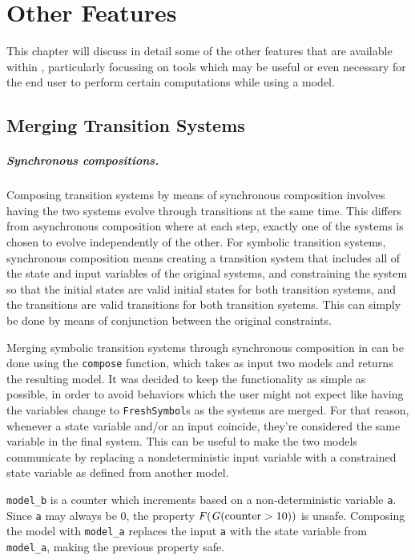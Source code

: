 \chapter{Other Features}
\label{ch:other-features}

This chapter will discuss in detail some of the other features that are available within \pyvmt{}, particularly focussing on tools which may be useful or even necessary for the end user to perform certain computations while using a model.

\section{Merging Transition Systems}
\paragraph*{Synchronous compositions.}
Composing transition systems by means of synchronous composition involves having the two systems evolve through transitions at the same time.
This differs from asynchronous composition where at each step, exactly one of the systems is chosen to evolve independently of the other.
For symbolic transition systems, synchronous composition means creating a transition system that includes all of the state and input variables of the original systems, and constraining the system so that the initial states are valid initial states for both transition systems, and the transitions are valid transitions for both transition systems.
This can simply be done by means of conjunction between the original constraints.

Merging symbolic transition systems through synchronous composition in \pyvmt{} can be done using the \texttt{compose} function, which takes as input two models and returns the resulting model.
It was decided to keep the functionality as simple as possible, in order to avoid behaviors which the user might not expect like having the variables change to \texttt{FreshSymbol}s as the systems are merged.
For that reason, whenever a state variable and/or an input coincide, they're considered the same variable in the final system.
This can be useful to make the two models communicate by replacing a nondeterministic input variable with a constrained state variable as defined from another model.

\begin{listing}
    \label{alg:composition}
    \caption{\texttt{model\_b} is a counter which increments based on a non-deterministic variable \texttt{a}. Since \texttt{a} may always be 0, the property $\F (\G (\mathrm{counter} > 10))$ is unsafe.
    Composing the model with \texttt{model\_a} replaces the input \texttt{a} with the state variable from \texttt{model\_a}, making the previous property safe.}
\end{listing}

